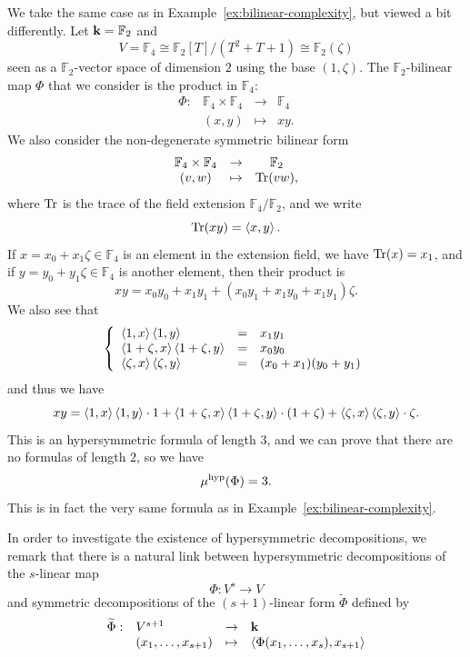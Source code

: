 \begin{ex}
  \label{ex:trisymmetric-formula}
  We take the same case as in Example~\ref{ex:bilinear-complexity}, but viewed
  a bit differently. Let $\mathbf{k}=\mathbb{F}_2$ and 
  \[
    V=\mathbb{F}_4\cong\mathbb{F}_2[T]/(T^2+T+1)\cong\mathbb{F}_2(\zeta)
  \]
  seen as a $\mathbb{F}_2$-vector space of dimension $2$ using the base $(1,
  \zeta)$. The $\mathbb{F}_2$-bilinear map $\Phi$ that we
  consider is the product in $\mathbb{F}_4$:
  \[
 \begin{array}{cccc}
   \Phi: & \mathbb{F}_4\times \mathbb{F}_4 &\to&\mathbb{F}_4\\
 &(x,y)&\mapsto&xy.
 \end{array}
  \]
  We also consider the non-degenerate symmetric bilinear form
\[
 \begin{array}{ccc}
   \mathbb{F}_4\times \mathbb{F}_4 &\to&\mathbb{F}_2\\
 (v,w)&\mapsto&\operatorname{Tr}(vw),
 \end{array}
\]
where $\operatorname{Tr}$ is the trace of the field extension $\mathbb{F}_4/\mathbb{F}_2$,
and we write
\[
  \operatorname{Tr}(xy) = \left\langle x,y\right\rangle.
\]
If $x = x_0 + x_1\zeta\in\mathbb{F}_4$ is an element in the extension field, we have $\operatorname{Tr}(x) = x_1$, and if $y = y_0
+ y_1\zeta\in\mathbb{F}_4$ is another element, then their product is
\[
  xy = x_0y_0 + x_1y_1 + (x_0y_1 + x_1y_0 + x_1y_1)\zeta.
\]
We also see that
\[
\left\{ 
  \begin{array}{lll}
    \left\langle1,x\right\rangle\left\langle1,y\right\rangle &=& x_1y_1 \\
    \left\langle1+\zeta,x\right\rangle\left\langle1+\zeta,y\right\rangle &=& x_0y_0 \\
    \left\langle\zeta,x\right\rangle\left\langle\zeta,y\right\rangle &=& (x_0+x_1)(y_0+y_1)
  \end{array}
\right.
\]
and thus we have
\[
  xy =
  \left\langle1,x\right\rangle\left\langle1,y\right\rangle\cdot1+\left\langle1+\zeta,x\right\rangle\left\langle1+\zeta,y\right\rangle\cdot(1+\zeta)+\left\langle\zeta,x\right\rangle\left\langle\zeta,y\right\rangle\cdot\zeta.
\]
This is an hypersymmetric formula of length $3$, and we can prove that there are
no formulas of length $2$, so we have
\[
  \mu^{\textrm{hyp}}(\Phi) = 3.
\]
This is in fact the very same formula as in
Example~\ref{ex:bilinear-complexity}.
\end{ex}
In order to investigate the existence of hypersymmetric decompositions, we
remark that there is a natural link between hypersymmetric decompositions of 
the $s$-linear map
\[
  \Phi:V^s\to V
\]
and symmetric decompositions of the $(s+1)$-linear form $\widetilde\Phi$ defined by
\[
  \begin{array}{llll}
    \widetilde\Phi:&V^{s+1}&\to&\mathbf{k}\\
    &(x_1, \dots, x_{s+1})&\mapsto&\left\langle\Phi(x_1, \dots, x_s),x_{s+1}\right\rangle
  \end{array}
\]
